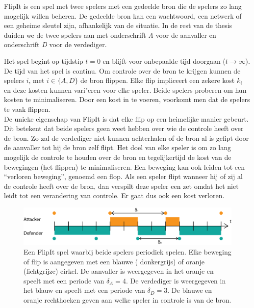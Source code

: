 \documentclass[master=cws, masteroption=vs,english]{kulemt}
\begin{document}
\begin{abstract*}
FlipIt is een spel met twee spelers met een gedeelde bron die de spelers zo lang mogelijk willen beheren. De gedeelde bron kan een wachtwoord, een netwerk of een geheime sleutel zijn, afhankelijk van de situatie. In de rest van de thesis duiden we de twee spelers aan met onderschrift  \textit{A} voor de aanvaller en onderschrift \textit{D} voor de verdediger.

Het spel begint op tijdstip $ t = 0 $ en blijft voor onbepaalde tijd doorgaan ($ t \rightarrow \infty $). De tijd van het spel is continu. Om controle over de bron te krijgen kunnen de spelers $i$, met $ i \in \{A, D \} $ de bron flippen. Elke flip impliceert een zekere kost $ k_{i} $ en deze kosten kunnen vari"eren voor elke speler. Beide spelers proberen om hun kosten te minimaliseren. Door een kost in te voeren, voorkomt men dat de spelers te vaak flippen. \\

De unieke eigenschap van FlipIt is dat elke flip op een heimelijke manier gebeurt. Dit betekent dat beide spelers geen weet hebben over wie de controle heeft over de bron. Zo zal de verdediger niet kunnen achterhalen of de bron al is gefipt door de aanvaller tot hij de bron zelf flipt. Het doel van elke speler is om zo lang mogelijk de controle te houden over de bron en tegelijkertijd de kost van de bewegingen (het flippen) te minimaliseren. Een beweging kan ook leiden tot een ``verloren beweging'', genoemd een flop.  Als een speler flipt wanneer hij of zij al de controle  heeft over de bron, dan verspilt deze speler een zet omdat het niet leidt tot een verandering van controle. Er gaat dus ook een kost verloren. \\


\begin{figure}[hbtp]
\center
\includegraphics[scale=0.7]{../../doc/template/Images/DefFlipit}
\caption{Een FlipIt spel waarbij beide spelers periodiek spelen. Elke beweging of flip is aangegeven met een blauwe ( donkergrijs) of oranje (lichtgrijze) cirkel. De aanvaller is weergegeven in het oranje en speelt met een periode van $ \delta_{A} = 4 $. De verdediger is weergegeven in het blauw en speelt met een periode van $ \delta_{D} = 3 $. De blauwe en oranje rechthoeken geven aan welke speler in controle is van de bron.}
\label{fig: FLipItDefault}
\end{figure}




\end{abstract*}
\end{document}
